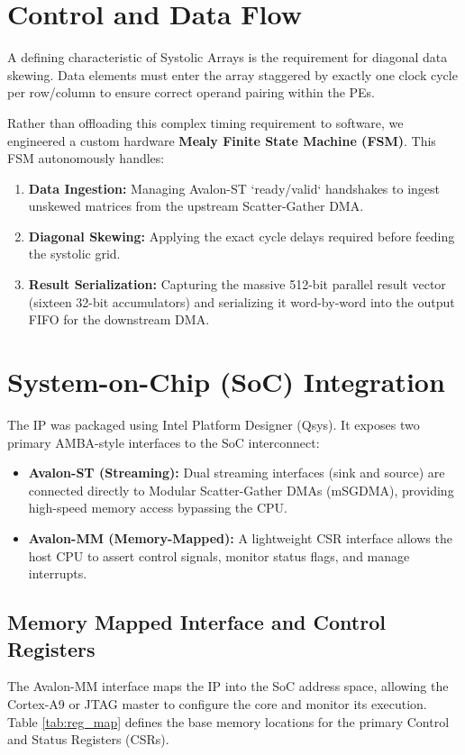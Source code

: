 \documentclass[12pt, letterpaper]{article}
\begin{document}
\section{Control and Data Flow}
A defining characteristic of Systolic Arrays is the requirement for diagonal data skewing. Data elements must enter the array staggered by exactly one clock cycle per row/column to ensure correct operand pairing within the PEs.

Rather than offloading this complex timing requirement to software, we engineered a custom hardware \textbf{Mealy Finite State Machine (FSM)}. This FSM autonomously handles:
\begin{enumerate}
    \item \textbf{Data Ingestion:} Managing Avalon-ST `ready/valid` handshakes to ingest unskewed matrices from the upstream Scatter-Gather DMA.
    \item \textbf{Diagonal Skewing:} Applying the exact cycle delays required before feeding the systolic grid.
    \item \textbf{Result Serialization:} Capturing the massive 512-bit parallel result vector (sixteen 32-bit accumulators) and serializing it word-by-word into the output FIFO for the downstream DMA.
\end{enumerate}

\section{System-on-Chip (SoC) Integration}
The IP was packaged using Intel Platform Designer (Qsys). It exposes two primary AMBA-style interfaces to the SoC interconnect:
\begin{itemize}
    \item \textbf{Avalon-ST (Streaming):} Dual streaming interfaces (sink and source) are connected directly to Modular Scatter-Gather DMAs (mSGDMA), providing high-speed memory access bypassing the CPU.
    \item \textbf{Avalon-MM (Memory-Mapped):} A lightweight CSR interface allows the host CPU to assert control signals, monitor status flags, and manage interrupts.
\end{itemize}

\subsection{Memory Mapped Interface and Control Registers}
The Avalon-MM interface maps the IP into the SoC address space, allowing the Cortex-A9 or JTAG master to configure the core and monitor its execution. Table \ref{tab:reg_map} defines the base memory locations for the primary Control and Status Registers (CSRs).
\end{document}
